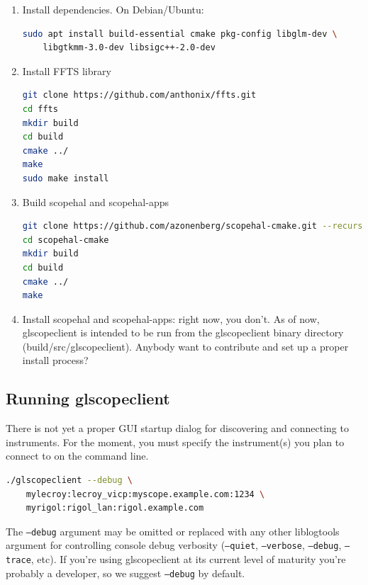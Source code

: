 \documentclass[11pt]{article}
\begin{document}
\begin{enumerate}

\item Install dependencies. On Debian/Ubuntu:
\begin{lstlisting}[language=sh]
sudo apt install build-essential cmake pkg-config libglm-dev \
	libgtkmm-3.0-dev libsigc++-2.0-dev
\end{lstlisting}

\item Install FFTS library
\begin{lstlisting}[language=sh]
git clone https://github.com/anthonix/ffts.git
cd ffts
mkdir build
cd build
cmake ../
make
sudo make install
\end{lstlisting}

\item Build scopehal and scopehal-apps
\begin{lstlisting}[language=sh]
git clone https://github.com/azonenberg/scopehal-cmake.git --recurse-submodules
cd scopehal-cmake
mkdir build
cd build
cmake ../
make
\end{lstlisting}

\item Install scopehal and scopehal-apps: right now, you don't. As of now, glscopeclient is intended to be run from the
glscopeclient binary directory (build/src/glscopeclient). Anybody want to contribute and set up a proper install
process?

\end{enumerate}

\subsection{Running glscopeclient}

There is not yet a proper GUI startup dialog for discovering and connecting to instruments. For the moment, you must
specify the instrument(s) you plan to connect to on the command line.

\begin{lstlisting}[language=sh]
./glscopeclient --debug \
	mylecroy:lecroy_vicp:myscope.example.com:1234 \
	myrigol:rigol_lan:rigol.example.com
\end{lstlisting}

The \texttt{--debug} argument may be omitted or replaced with any other liblogtools argument for controlling console
debug verbosity (\texttt{--quiet}, \texttt{--verbose}, \texttt{--debug}, \texttt{--trace}, etc). If you're using
glscopeclient at its current level of maturity you're probably a developer, so we suggest \texttt{--debug} by default.
\end{document}
